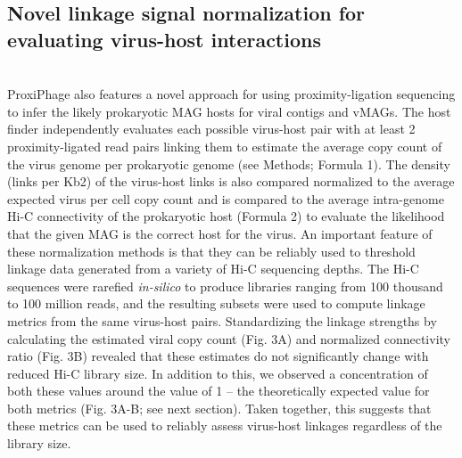 \subsection*{Novel linkage signal normalization for evaluating virus-host interactions} \hfill\\
	ProxiPhage also features a novel approach for using proximity-ligation sequencing to infer the likely prokaryotic MAG hosts for viral contigs and vMAGs. The host finder independently evaluates each possible virus-host pair with at least 2 proximity-ligated read pairs linking them to estimate the average copy count of the virus genome per prokaryotic genome (see Methods; Formula 1). The density (links per Kb2) of the virus-host links is also compared normalized to the average expected virus per cell copy count and is compared to the average intra-genome Hi-C connectivity of the prokaryotic host (Formula 2) to evaluate the likelihood that the given MAG is the correct host for the virus. An important feature of these normalization methods is that they can be reliably used to threshold linkage data generated from a variety of Hi-C sequencing depths. The Hi-C sequences were rarefied \textit{in-silico} to produce libraries ranging from 100 thousand to 100 million reads, and the resulting subsets were used to compute linkage metrics from the same virus-host pairs. Standardizing the linkage strengths by calculating the estimated viral copy count (Fig. 3A) and normalized connectivity ratio (Fig. 3B) revealed that these estimates do not significantly change with reduced Hi-C library size. In addition to this, we observed a concentration of both these values around the value of 1 – the theoretically expected value for both metrics (Fig. 3A-B; see next section). Taken together, this suggests that these metrics can be used to reliably assess virus-host linkages regardless of the library size. 
 
 
 
